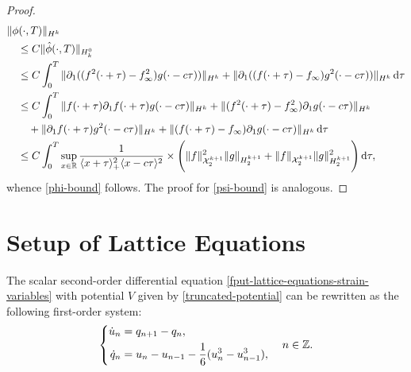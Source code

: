 \begin{proof}
\begin{equation}
\begin{aligned}
		&\|\phi(\cdot, T) \|_{H^k} \\
		&\quad\leq C \| \hat\phi(\cdot, T) \|_{H^0_k} \\
		&\quad\leq C \int_0^T \| \partial_1 ((f^2(\cdot+\tau)-f_\infty^2)g(\cdot-c\tau)) \|_{H^k} + \| \partial_1( (f(\cdot+\tau)-f_\infty)g^2(\cdot-c\tau)) \|_{H^k} \, \mathrm d \tau \\
		&\quad\leq C \int_0^T \| f(\cdot+\tau)\partial_1 f(\cdot + \tau)g(\cdot-c\tau) \|_{H^k} + \|(f^2(\cdot+\tau) -f_\infty^2) \partial_1 g(\cdot - c\tau) \|_{H^k}  \\
		&\qquad + \|\partial_1f(\cdot+\tau) g^2(\cdot - c\tau) \|_{H^k} + \| (f(\cdot + \tau) -f_\infty) \partial_1 g(\cdot - c\tau) \|_{H^k}\, \mathrm{d}\tau \\ 
		&\quad\leq C \int_0^T \sup_{x\in\mathbb{R}} \frac 1 {\langle x + \tau\rangle_+^2 \langle x - c\tau\rangle^2} \times \Bigg( \|f\|^2_{\mathcal X^{k+1}_{2}} \| g \|_{H^{k+1}_2} + \|f\|_{\mathcal X^{k+1}_{2}} \| g \|^2_{H^{k+1}_2} \Bigg) \, \mathrm d \tau, 
	\end{aligned}
	\end{equation}
	whence \cref{phi-bound} follows. The proof for \cref{psi-bound} is analogous.
\end{proof}

\section{Setup of Lattice Equations}

The scalar second-order differential equation \cref{fput-lattice-equations-strain-variables} with potential \(V\) given by \cref{truncated-potential} can be rewritten as the following first-order system:
\begin{equation}\label{first-order-lattice-eqns}
	\left\{\begin{aligned}\dot u _n &= q_{n+1} - q_n, \\
	\dot q_n &= u_n - u_{n-1} - \frac{1} 6 ( u_n^3 - u^3_{n-1}),\end{aligned} \right. \quad n \in \mathbb{Z}.
\end{equation}

